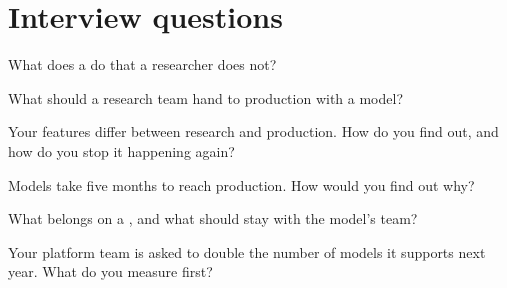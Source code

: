 \section{Interview questions}

\begin{interviewq}\label{iq:ml:the-machine-learning-team:1}
What does a  do that a researcher does not?
\end{interviewq}

\begin{interviewq}\label{iq:ml:the-machine-learning-team:2}
What should a research team hand to production with a model?
\end{interviewq}

\begin{interviewq}\label{iq:ml:the-machine-learning-team:3}
Your features differ between research and production. How do you find out, and how do you stop it happening again?
\end{interviewq}

\begin{interviewq}\label{iq:ml:the-machine-learning-team:4}
Models take five months to reach production. How would you find out why?
\end{interviewq}

\begin{interviewq}\label{iq:ml:the-machine-learning-team:5}
What belongs on a , and what should stay with the model's team?
\end{interviewq}

\begin{interviewq}\label{iq:ml:the-machine-learning-team:6}
Your platform team is asked to double the number of models it supports next year. What do you measure first?
\end{interviewq}
